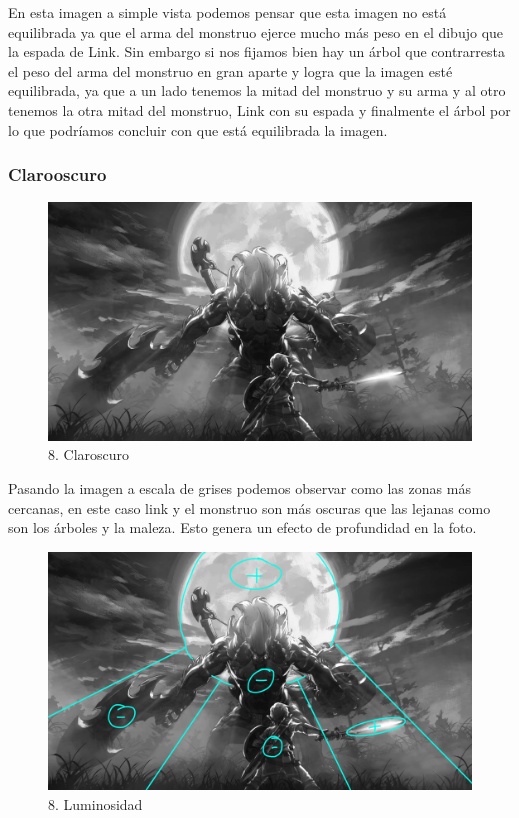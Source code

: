\documentclass[12pt]{article}
\begin{document}
En esta imagen a simple vista podemos pensar que esta imagen no está equilibrada ya que el arma del monstruo ejerce mucho más peso en el dibujo que la espada de Link. Sin embargo si nos fijamos bien hay un árbol que contrarresta el peso del arma del monstruo en gran aparte y logra que la imagen esté equilibrada, ya que a un lado tenemos la mitad del monstruo y su arma y al otro tenemos la otra mitad del monstruo, Link con su espada y finalmente el árbol por lo que podríamos concluir con que está equilibrada la imagen. 


        \subsubsection{Clarooscuro}

\begin{figure}[H]
      \centering
      \includegraphics[scale=0.25]{images/Raúl/Sección 8/Imagen 8 gris.jpg}
      \caption{\small 8. Claroscuro}
    \end{figure}

 Pasando la imagen a escala de grises podemos observar como las zonas más cercanas, en este caso link y el monstruo son más oscuras que las lejanas como son los árboles y la maleza. Esto genera un efecto de profundidad en la foto.

\begin{figure}[H]
      \centering
      \includegraphics[scale=0.25]{images/Raúl/Sección 8/Imagen 8 gris lumin.jpg}
      \caption{\small 8. Luminosidad}
    \end{figure}
\end{document}

